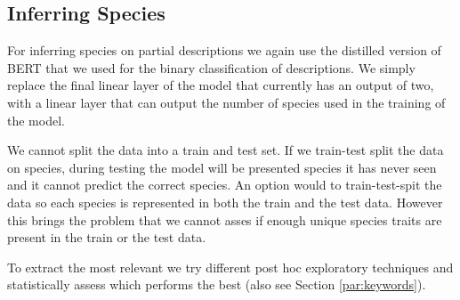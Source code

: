 \documentclass[a4paper, 12pt, oneside]{book} %
\begin{document}

\subsection{Inferring Species} \label{par:inferring}
For inferring species on partial descriptions we again use the distilled version of BERT \autocite{sanh_distilbert_2020, devlin_bert_2019} that we used for the binary classification of descriptions.
We simply replace the final linear layer of the model that currently has an output of two, with a linear layer that can output the number of species used in the training of the model.

We cannot split the data into a train and test set.
If we train-test split the data on species, during testing the model will be presented species it has never seen and it cannot predict the correct species.
An option would to train-test-spit the data so each species is represented in both the train and the test data.
However this brings the problem that we cannot asses if enough unique species traits are present in the train or the test data.

To extract the most relevant we try different post hoc exploratory techniques and statistically assess which performs the best (also see Section \ref{par:keywords}).
\end{document}
